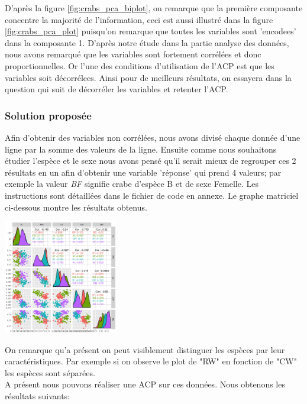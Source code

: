\documentclass[10pt]{article}
\begin{document}
	D'après la figure \ref{fig:crabs_pca_biplot}, on remarque que la première composante concentre la majorité de l'information, ceci est aussi illustré dans la figure \ref{fig:crabs_pca_plot} puisqu'on remarque que toutes les variables sont 'encodees' dans la composante 1. D'après notre étude dans la partie analyse des données, nous avons remarqué que les variables sont fortement corrélées et donc proportionnelles. Or l'une des conditions d'utilisation de l'ACP est que les variables soit décorrélees. Ainsi pour de meilleurs résultats, on essayera dans la question qui suit de décorréler les variables et retenter l'ACP.
	
	\subsubsection{Solution proposée}
	Afin d'obtenir des variables non corrélées, nous avons divisé chaque donnée d'une ligne par la somme des valeurs de la ligne. Ensuite comme nous souhaitons étudier l'espèce et le sexe nous avons pensé qu'il serait mieux de regrouper ces 2 résultats en un afin d'obtenir une variable 'réponse' qui prend 4 valeurs; par exemple la valeur \textit{BF} signifie crabe d'espèce B et de sexe Femelle. Les instructions sont détaillées dans le fichier de code en annexe. Le graphe matriciel  ci-dessous montre les résultats obtenus.
	
	\begin{center}
		\includegraphics[width=50mm]{Figures/Crabs/matricial_plot_decorr_classes.png}	
		\label{fig:crabs_matricial_plot_decorr}
	\end{center}

	On remarque qu'a présent on peut visiblement distinguer les espèces par leur caractéristiques. Par exemple si on observe le plot de  "RW" en fonction de "CW" les espèces sont séparées.\\
	
	A présent nous pouvons réaliser une ACP sur ces données. Nous obtenons les résultats suivants:
	
\end{document}
